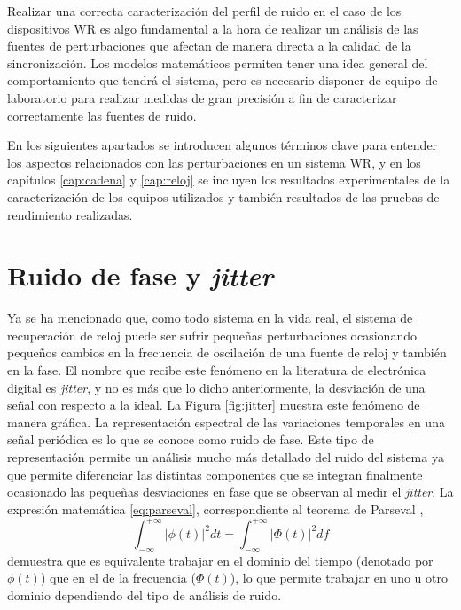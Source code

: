 Realizar una correcta caracterización del perfil de ruido en el caso de los 
dispositivos WR es algo fundamental a la hora de realizar un análisis de las 
fuentes de perturbaciones que afectan de manera directa a la calidad de la 
sincronización. Los modelos matemáticos permiten tener una idea general del 
comportamiento que tendrá el sistema, pero es necesario disponer de equipo de 
laboratorio para realizar medidas de gran precisión a fin de caracterizar 
correctamente las fuentes de ruido.

En los siguientes apartados se introducen algunos términos clave para entender 
los aspectos relacionados con las perturbaciones en un sistema WR, y en los 
capítulos \ref{cap:cadena} y \ref{cap:reloj} se incluyen los resultados 
experimentales de la caracterización de los equipos utilizados y también 
resultados de las pruebas de rendimiento realizadas.

\section{Ruido de fase y \textit{jitter}}

Ya se ha mencionado que, como todo sistema en la vida real, el sistema de 
recuperación de reloj puede ser sufrir pequeñas perturbaciones ocasionando 
pequeños cambios en la frecuencia de oscilación de una fuente de reloj y 
también en la fase. El nombre que recibe este fenómeno en la literatura de 
electrónica digital es \textit{jitter}, y no es más que lo dicho anteriormente, 
la desviación de una señal con respecto a la ideal. La Figura \ref{fig:jitter} 
muestra este fenómeno de manera gráfica. La representación espectral de las 
variaciones temporales en una señal periódica es lo que se conoce como ruido de 
fase. Este tipo de representación permite un análisis mucho más detallado del 
ruido del sistema ya que permite diferenciar las distintas componentes que se 
integran finalmente ocasionado las pequeñas desviaciones en fase que se 
observan al medir el \textit{jitter}. La expresión matemática 
\ref{eq:parseval}, correspondiente al teorema de Parseval \cite{oppenheim96},
\begin{equation}\label{eq:parseval}
\int_{-\infty}^{+\infty} | \phi (t) |^2 dt = 
\int_{-\infty}^{+\infty} | \Phi (t) |^2 df
\end{equation}
 demuestra que es equivalente trabajar en el dominio del tiempo (denotado por 
 $\phi (t)$) que en el de la frecuencia ($\Phi (t)$), lo que permite trabajar 
 en uno u otro dominio dependiendo del tipo de análisis de ruido.



